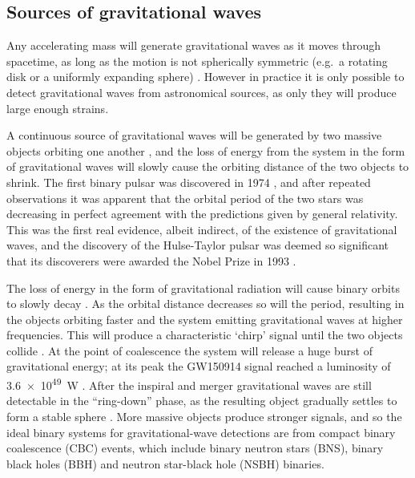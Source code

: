 
\subsection{Sources of gravitational waves}
\label{sec:gw_sources}
\begin{colsection}

Any accelerating mass will generate gravitational waves as it moves through spacetime, as long as the motion is not spherically symmetric (e.g.\ a rotating disk or a uniformly expanding sphere) \citep{BIGcardiff,BIGparis}. However in practice it is only possible to detect gravitational waves from astronomical sources, as only they will produce large enough strains.

A continuous source of gravitational waves will be generated by two massive objects orbiting one another \citep{GW_sources}, and the loss of energy from the system in the form of gravitational waves will slowly cause the orbiting distance of the two objects to shrink. The first binary pulsar was discovered in 1974 \citep{HulseTaylor}, and after repeated observations it was apparent that the orbital period of the two stars was decreasing in perfect agreement with the predictions given by general relativity. This was the first real evidence, albeit indirect, of the existence of gravitational waves, and the discovery of the Hulse-Taylor pulsar was deemed so significant that its discoverers were awarded the Nobel Prize in 1993 \citep{HulseTaylor2}.

The loss of energy in the form of gravitational radiation will cause binary orbits to slowly decay \citep[unless counteracted by another process, such as mass transfer;][]{binary_masstransfer}. As the orbital distance decreases so will the period, resulting in the objects orbiting faster and the system emitting gravitational waves at higher frequencies. This will produce a characteristic `chirp' signal until the two objects collide \citep{GW_sources, BIGparis}. At the point of coalescence the system will release a huge burst of gravitational energy; at its peak the GW150914 signal reached a luminosity of \SI{3.6e49}{\watt} \citep[greater than the combined luminosity of all stars in the observable universe;][]{GW150914}. After the inspiral and merger gravitational waves are still detectable in the ``ring-down'' phase, as the resulting object gradually settles to form a stable sphere \citep{GW_ringdown}. More massive objects produce stronger signals, and so the ideal binary systems for gravitational-wave detections are from compact binary coalescence (CBC)  events, which include binary neutron stars  (BNS), binary black holes  (BBH) and neutron star-black hole (NSBH)  binaries.


\end{colsection}
